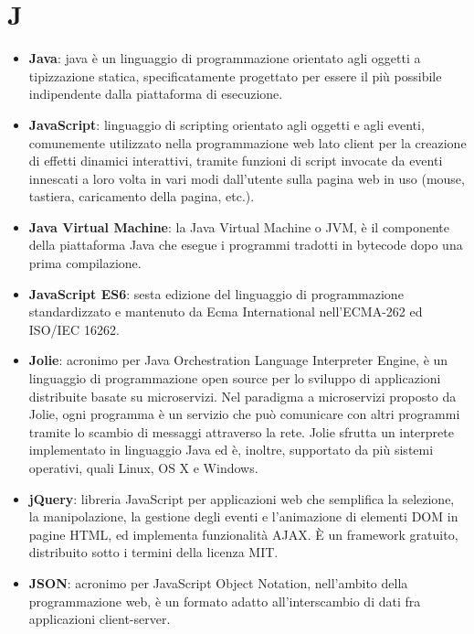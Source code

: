 \newpage
\section{J}

\begin{itemize}
	\item \textbf{Java}: java è un linguaggio di programmazione orientato agli oggetti a tipizzazione statica, specificatamente progettato per essere il più possibile indipendente dalla piattaforma di esecuzione.
	\item \textbf{JavaScript}: linguaggio di scripting orientato agli oggetti e agli eventi, comunemente utilizzato nella programmazione web lato client per la creazione di effetti dinamici interattivi, tramite funzioni di script invocate da eventi innescati a loro volta in vari modi dall'utente sulla pagina web in uso (mouse, tastiera, caricamento della pagina, etc.).
	\item \textbf{Java Virtual Machine}: la Java Virtual Machine o JVM, è il componente della piattaforma Java che esegue i programmi tradotti in bytecode dopo una prima compilazione.
	\item \textbf{JavaScript ES6}: sesta edizione del linguaggio di programmazione standardizzato e mantenuto da Ecma International nell'ECMA-262 ed ISO/IEC 16262.
	\item \textbf{Jolie}: acronimo per Java Orchestration Language Interpreter Engine, è un linguaggio di programmazione open source per lo sviluppo di applicazioni distribuite basate su microservizi. Nel paradigma a microservizi proposto da Jolie, ogni programma è un servizio che può comunicare con altri programmi tramite lo scambio di messaggi attraverso la rete. Jolie sfrutta un interprete implementato in linguaggio Java ed è, inoltre, supportato da più sistemi operativi, quali Linux, OS X e Windows.
	\item \textbf{jQuery}: libreria JavaScript per applicazioni web che semplifica la selezione, la manipolazione, la gestione degli eventi e l'animazione di elementi DOM in pagine HTML, ed implementa funzionalità AJAX. \MakeUppercase{è} un framework gratuito, distribuito sotto i termini della licenza MIT.
	\item \textbf{JSON}: acronimo per JavaScript Object Notation, nell'ambito della programmazione web, è un formato adatto all'interscambio di dati fra applicazioni client-server.
\end{itemize}
